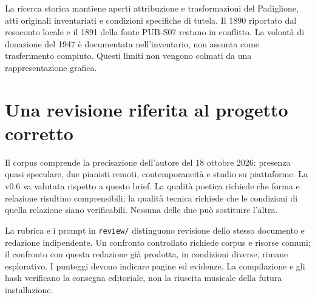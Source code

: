 La ricerca storica mantiene aperti attribuzione e trasformazioni del Padiglione, atti originali inventariati e condizioni specifiche di tutela. Il 1890 riportato dal resoconto locale \cite{primabergamo2024} e il 1891 della fonte PUB-S07 restano in conflitto. La volontà di donazione del 1947 è documentata nell'inventario, non assunta come trasferimento compiuto. Questi limiti non vengono colmati da una rappresentazione grafica.

\section{Una revisione riferita al progetto corretto}
Il corpus comprende la precisazione dell'autore del 18 ottobre 2026: presenza quasi speculare, due pianisti remoti, contemporaneità e studio su piattaforme. La v0.6 va valutata rispetto a questo brief. La qualità poetica richiede che forma e relazione risultino comprensibili; la qualità tecnica richiede che le condizioni di quella relazione siano verificabili. Nessuna delle due può sostituire l'altra.

La rubrica e i prompt in \texttt{review/} distinguono revisione dello stesso documento e redazione indipendente. Un confronto controllato richiede corpus e risorse comuni; il confronto con questa redazione già prodotta, in condizioni diverse, rimane esplorativo. I punteggi devono indicare pagine ed evidenze. La compilazione e gli hash verificano la consegna editoriale, non la riuscita musicale della futura installazione.
